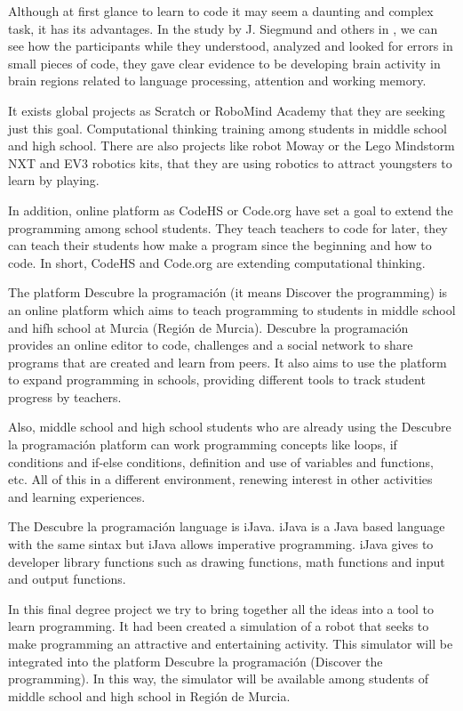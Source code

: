 Although at first glance to learn to code it may seem a daunting and complex task, it has its advantages. In the study by J. Siegmund and others in \cite{siegmund2014understanding}, we can see how the participants while they understood, analyzed and looked for errors in small pieces of code, they gave clear evidence to be developing brain activity in brain regions related to language processing, attention and working memory.

It exists global projects as Scratch or RoboMind Academy that they are seeking just this goal. Computational thinking training among students in middle school and high school. There are also projects like robot Moway or the Lego Mindstorm NXT and EV3 robotics kits, that they are using robotics to attract youngsters to learn by playing. 

In addition, online platform as CodeHS or Code.org have set a goal to extend the programming among school students. They teach teachers to code for later, they can teach their students how make a program since the beginning and how to code. In short, CodeHS and Code.org are extending computational thinking.

The platform Descubre la programación (it means Discover the programming) is an online platform which aims to teach programming to students in middle school and hifh school at Murcia (Región de Murcia). Descubre la programación provides an online editor to code, challenges and a social network to share programs that are created and learn from peers. It also aims to use the platform to expand programming in schools, providing different tools to track student progress by teachers.


Also, middle school and high school students who are already using the Descubre la programación platform can work programming concepts  like loops, if conditions and if-else conditions, definition and use of variables and functions, etc. All of this in a different environment, renewing interest in other activities and learning experiences.


The Descubre la programación language is iJava. iJava is a Java based language with the same sintax but iJava allows imperative programming. iJava gives to developer library functions such as drawing functions, math functions and input and output functions.

In this final degree project we try to bring together all the ideas into a tool to learn programming. It had been created a simulation of a robot that seeks to make programming an attractive and entertaining activity. This simulator will be integrated into the platform Descubre la programación (Discover the programming). In this way, the simulator will be available among students of middle school and high school in Región de Murcia.

